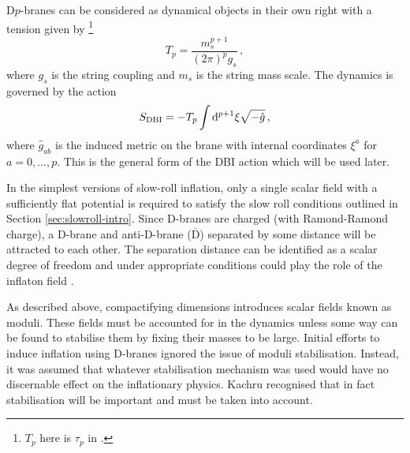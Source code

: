 D$p$-branes can be considered as dynamical objects in their own right with a
tension given by \cite{Johnson2000}\footnote{$T_p$ here is $\tau_p$ in
\cite{Johnson2000}.}
% 
\begin{equation}
\label{eq:branetensiondefn-dbiintro}
 T_p = \frac{m_s^{p+1}}{(2\pi)^p g_s}\,,
\end{equation}
% 
where $g_s$ is the string coupling and $m_s$ is the string mass scale.
The dynamics is governed by the action 
% 
\begin{equation}
\label{eq:gendbiaction-dbiintro}
 S_\mathrm{DBI} = -T_p \int \mathrm{d}^{p+1}\xi \sqrt{-\hat{g}}\,,
\end{equation}
where $\hat{g}_{ab}$ is the induced metric on the brane with internal
coordinates $\xi^a$ for $a=0,\ldots,p$. This is the general form of the DBI
action which will be used later.


In the simplest versions of slow-roll inflation, only a single scalar field
with a
sufficiently flat potential is required to satisfy the slow roll conditions outlined
in
Section \ref{sec:slowroll-intro}. Since D-branes are charged (with Ramond-Ramond
charge), a D-brane and anti-D-brane
($\overline{\mathrm{D}}$) separated by some distance will be attracted to each other.
The separation distance
can be identified as a scalar degree of freedom and under appropriate conditions
could play the role of the inflaton
field \cite{brane1,brane2,brane3,brane7,Brodie:2003qv,brane9}. 

As described above, compactifying dimensions
introduces scalar fields known as moduli. These fields must be
accounted for in the dynamics unless some way can be found to stabilise them by
fixing their masses to be large.
Initial efforts to induce inflation using D-branes ignored the issue of moduli
stabilisation. Instead, it was
assumed that whatever stabilisation mechanism was used would have no discernable
effect on the inflationary physics. Kachru \etal \cite{brane4} recognised that
in fact stabilisation will be important and must be taken into account.

